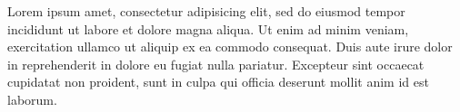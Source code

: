 \documentclass{article}
\begin{document}
{}

Lorem ipsum  amet, consectetur adipisicing elit, sed do
eiusmod tempor incididunt ut labore et dolore magna aliqua. Ut enim ad
minim veniam,  exercitation ullamco  ut aliquip ex ea commodo consequat. Duis aute irure dolor in
reprehenderit in  dolore eu fugiat
nulla pariatur. Excepteur sint occaecat cupidatat non proident, sunt in
culpa qui officia deserunt mollit anim id est laborum.
\end{document}
